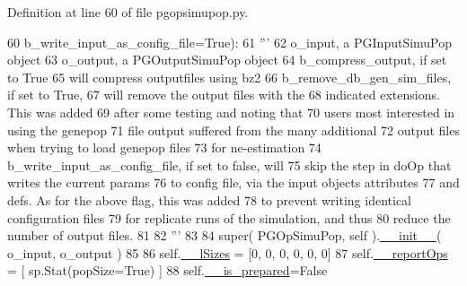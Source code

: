 Definition at line 60 of file pgopsimupop.\+py.


\begin{DoxyCode}
60                                     b\_write\_input\_as\_config\_file=\textcolor{keyword}{True}):  
61         \textcolor{stringliteral}{'''}
62 \textcolor{stringliteral}{            o\_input, a PGInputSimuPop object}
63 \textcolor{stringliteral}{            o\_output, a PGOutputSimuPop object}
64 \textcolor{stringliteral}{            b\_compress\_output, if set to True}
65 \textcolor{stringliteral}{                will compress outputfiles using bz2}
66 \textcolor{stringliteral}{            b\_remove\_db\_gen\_sim\_files, if set to True,}
67 \textcolor{stringliteral}{                will remove the output files with the}
68 \textcolor{stringliteral}{                indicated extensions.  This was added}
69 \textcolor{stringliteral}{                after some testing and noting that}
70 \textcolor{stringliteral}{                users most interested in using the genepop}
71 \textcolor{stringliteral}{                file output suffered from the many additional}
72 \textcolor{stringliteral}{                output files when trying to load genepop files}
73 \textcolor{stringliteral}{                for ne-estimation}
74 \textcolor{stringliteral}{            b\_write\_input\_as\_config\_file, if set to false, will }
75 \textcolor{stringliteral}{                skip the step in doOp that writes the current params}
76 \textcolor{stringliteral}{                to config file, via the input objects attributes }
77 \textcolor{stringliteral}{                and defs. As for the above flag, this was added}
78 \textcolor{stringliteral}{                to prevent writing identical configuration files}
79 \textcolor{stringliteral}{                for replicate runs of the simulation, and thus}
80 \textcolor{stringliteral}{                reduce the number of output files. }
81 \textcolor{stringliteral}{}
82 \textcolor{stringliteral}{        '''}
83 
84         super( PGOpSimuPop, self ).\hyperlink{classnegui_1_1pgopsimupop_1_1PGOpSimuPop_a6548b8996f7ace76266e629d9ff8c11e}{\_\_init\_\_}( o\_input, o\_output )
85 
86         self.\hyperlink{classnegui_1_1pgopsimupop_1_1PGOpSimuPop_a1061b53dea80371a6414760b43b2cd1e}{\_\_lSizes} = [0, 0, 0, 0, 0, 0]
87         self.\hyperlink{classnegui_1_1pgopsimupop_1_1PGOpSimuPop_a1224d81cfdf1400b2f12970074c81817}{\_\_reportOps} = [ sp.Stat(popSize=\textcolor{keyword}{True}) ]
88         self.\hyperlink{classnegui_1_1pgopsimupop_1_1PGOpSimuPop_ac10f21f990f51e85c7fab2b5aa888edd}{\_\_is\_prepared}=\textcolor{keyword}{False}

\end{DoxyCode}
